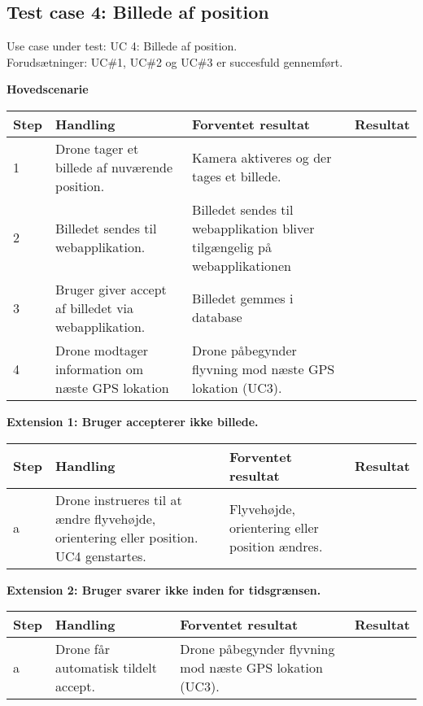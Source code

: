 \newpage

\subsection*{Test case 4: Billede af position}
Use case under test: UC 4: Billede af position.\\
Forudsætninger:	UC\#1, UC\#2 og UC\#3 er succesfuld gennemført.

\textbf{Hovedscenarie}
\begin{table}[H]
	\centering
		\begin{tabular}{|l|p{5 cm}|p{5 cm}|p{3.5 cm}|} 
		\hline
			Step & Handling & Forventet resultat & Resultat\\ \hline
			1 & Drone tager et billede af nuværende position. & Kamera aktiveres og der tages et billede. & \\ \hline
			2 & Billedet sendes til webapplikation. & Billedet sendes til webapplikation bliver tilgængelig på webapplikationen &  \\ \hline
			3 & Bruger giver accept af billedet via webapplikation. & Billedet gemmes i database  & \\ \hline
			4 & Drone modtager information om næste GPS lokation & Drone påbegynder flyvning mod næste GPS lokation (UC3). & \\ \hline

		\end{tabular}
\end{table}


\textbf{Extension 1: Bruger accepterer ikke billede.}
\begin{table}[H]
	\centering
		\begin{tabular}{|l|p{5 cm}|p{5 cm}|p{3.5 cm}|} 
		\hline
			Step & Handling & Forventet resultat & Resultat\\ \hline
			a & Drone instrueres til at ændre flyvehøjde, orientering eller position. UC4 genstartes. & Flyvehøjde, orientering eller position ændres. & \\ \hline
		\end{tabular}
\end{table}

\textbf{Extension 2: Bruger svarer ikke inden for tidsgrænsen.}
\begin{table}[H]
	\centering
		\begin{tabular}{|l|p{5 cm}|p{5 cm}|p{3.5 cm}|} 
		\hline
			Step & Handling & Forventet resultat & Resultat\\ \hline
			a & Drone får automatisk tildelt accept. & Drone påbegynder flyvning mod næste GPS lokation (UC3). & \\ \hline
		\end{tabular}
\end{table}

